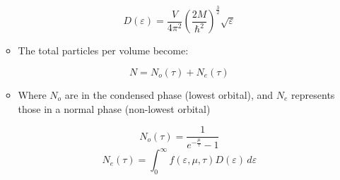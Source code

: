 \begin{itemize}
\begin{itemize}
        $$D(\varepsilon)=\frac{V}{4\pi^2}\left( \frac{2M}{\hbar^2} \right)^{\frac{3}{2}}\sqrt{\varepsilon}$$

      \item The total particles per volume become:

        $$N=N_o(\tau)+N_e(\tau)$$

      \item Where $N_o$ are in the condensed phase (lowest orbital), and $N_e$ represents those in a normal phase (non-lowest orbital)

        $$N_o(\tau)=\frac{1}{e^{-\frac{\mu}{\tau}}-1}$$
        $$N_e(\tau)=\int_0^\infty f(\varepsilon,\mu,\tau)D(\varepsilon)\,d\varepsilon$$

    \end{itemize}

\end{itemize}





